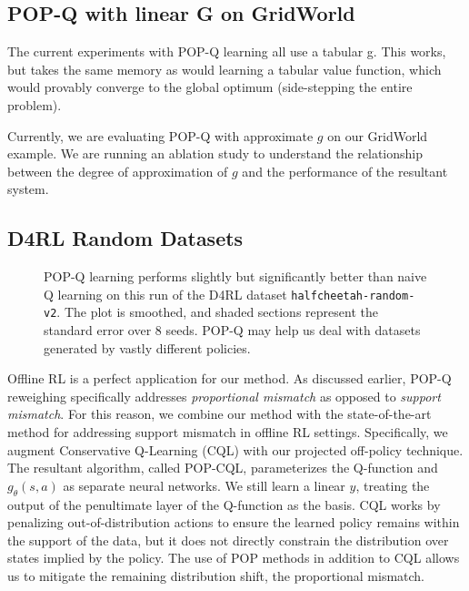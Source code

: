\subsection{POP-Q with linear G on GridWorld}

The current experiments with POP-Q learning all use a tabular g. This works, but takes the same memory as would learning a tabular value function, which would provably converge to the global optimum (side-stepping the entire problem).

Currently, we are evaluating POP-Q with approximate $g$ on our GridWorld example. We are running an ablation study to understand the relationship between the degree of approximation of $g$ and the performance of the resultant system.

\subsection{D4RL Random Datasets}

\begin{figure}[t]
  \centering
  
  \caption{
    POP-Q learning performs slightly but significantly better than naive Q learning on this run of the D4RL dataset \texttt{halfcheetah-random-v2}. The plot is smoothed, and shaded sections represent the standard error over 8 seeds. POP-Q may help us deal with datasets generated by vastly different policies.}
  \label{fig:d4rl}
\end{figure}

Offline RL is a perfect application for our method.
As discussed earlier, POP-Q reweighing specifically addresses \textit{proportional mismatch} as opposed to \textit{support mismatch}.
For this reason, we combine our method with the state-of-the-art method for addressing support mismatch in offline RL settings.
Specifically, we augment Conservative Q-Learning (CQL) \citep{kumar2020cql} with our projected off-policy technique.
The resultant algorithm, called POP-CQL, parameterizes the Q-function and $g_\theta(s, a)$ as separate neural networks. We still learn a linear $y$, treating the output of the penultimate layer of the Q-function as the basis.
CQL works by penalizing out-of-distribution actions to ensure the learned policy remains within the support of the data, but it does not directly constrain the distribution over states implied by the policy. The use of POP methods in addition to CQL allows us to mitigate the remaining distribution shift, the proportional mismatch.


